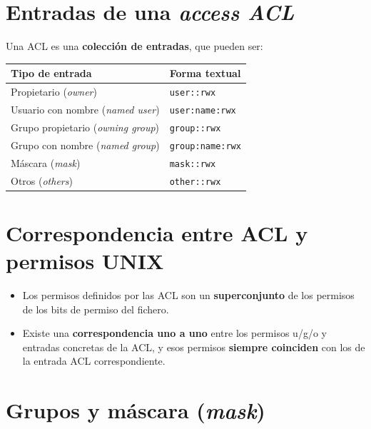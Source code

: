 \documentclass[11pt,a4paper]{report}
\begin{document}
\section{Entradas de una \emph{access ACL}}
 
Una ACL es una \textbf{colección de entradas}, que pueden ser:
 
\begin{center}
\small
{\renewcommand{\arraystretch}{1.25}%
\begin{tabular}{l l}
\toprule
\textbf{Tipo de entrada} & \textbf{Forma textual} \\
\midrule
Propietario (\emph{owner}) & \texttt{user::rwx} \\
Usuario con nombre (\emph{named user}) & \texttt{user:name:rwx} \\
Grupo propietario (\emph{owning group}) & \texttt{group::rwx} \\
Grupo con nombre (\emph{named group}) & \texttt{group:name:rwx} \\
Máscara (\emph{mask}) & \texttt{mask::rwx} \\
Otros (\emph{others}) & \texttt{other::rwx} \\
\bottomrule
\end{tabular}}
\end{center}
 
\section{Correspondencia entre ACL y permisos UNIX}
 
\begin{itemize}
  \item Los permisos definidos por las ACL son un \textbf{superconjunto} de los permisos de los bits de permiso del fichero.
  \item Existe una \textbf{correspondencia uno a uno} entre los permisos u/g/o y entradas concretas de la ACL, y esos permisos \textbf{siempre coinciden} con los de la entrada ACL correspondiente.
\end{itemize}
 
\section{Grupos y máscara (\emph{mask})}
 
\end{document}
